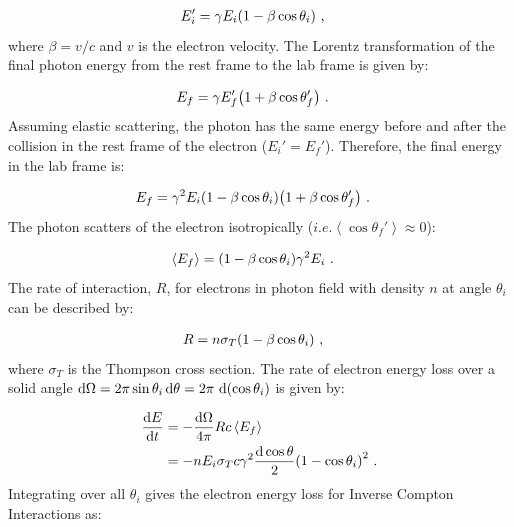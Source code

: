 \begin{equation}
    \begin{aligned}
        E_i'&=\gamma E_i\qty(1-\beta \cos\theta_i)\text{ ,}
    \end{aligned}    
\end{equation}
\noindent where $\beta = v/c$ and $v$ is the electron velocity. The Lorentz transformation of the final photon energy from the rest frame to the lab frame is given by:

\begin{equation}
	\begin{aligned}
		E_f&=\gamma E_f'\qty(1+\beta\cos\theta_f')\text{ .}
    \end{aligned}
\end{equation}
\noindent Assuming elastic scattering, the photon has the same energy before and after the collision in the rest frame of the electron ($E_i'=E_f'$). Therefore, the final energy in the lab frame is:

\begin{equation}
    \begin{aligned}
		E_f&=\gamma^2E_i\qty(1-\beta\cos\theta_i)\qty(1+\beta\cos\theta_f')\text{ .}
	\end{aligned}
\end{equation}
\noindent The photon scatters of the electron isotropically ($i.e.\left\langle\cos\theta_f'\right\rangle\approx 0$):

\begin{equation}
    \begin{aligned}
    \left\langle E_f\right\rangle&=\qty(1-\beta\cos\theta_i)\gamma^2 E_i\text{ .}
    \end{aligned}
\end{equation}
\noindent The rate of interaction, $R$, for electrons in photon field with density $n$ at angle $\theta_i$ can be described by:

\begin{equation}
    \begin{aligned}
    R&=n\sigma_T\qty(1-\beta\cos\theta_i)\text{ ,}
    \end{aligned}
\end{equation}
\noindent where $\sigma_T$ is the Thompson cross section. The rate of electron energy loss over a solid angle $\dd{\Omega}=2\pi\sin\theta_i\dd{\theta}=2\pi\,\dd{\qty(\cos\theta_i)}$ is given by:

\begin{equation}
	\begin{split}
		\dv{E}{t}&=-\frac{\dd{\Omega}}{4\pi}Rc\left\langle E_f\right\rangle \\
		&=-nE_i\sigma_T c\gamma^2\frac{\dd{\cos\theta}}{2}\qty(1-\cos\theta_i)^2\text{ .}
	\end{split}
\end{equation}
\noindent Integrating over all $\theta_i$ gives the electron energy loss for Inverse Compton Interactions as:

